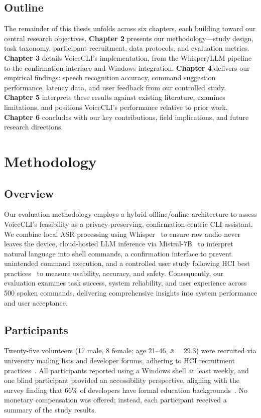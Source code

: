 \documentclass[a4paper,12pt]{article}
\begin{document}
\subsection{Outline}

The remainder of this thesis unfolds across six chapters, each building toward our central research objectives. \textbf{Chapter 2} presents our methodology—study design, task taxonomy, participant recruitment, data protocols, and evaluation metrics. \textbf{Chapter 3} details VoiceCLI's implementation, from the Whisper/LLM pipeline to the confirmation interface and Windows integration. \textbf{Chapter 4} delivers our empirical findings: speech recognition accuracy, command suggestion performance, latency data, and user feedback from our controlled study. \textbf{Chapter 5} interprets these results against existing literature, examines limitations, and positions VoiceCLI's performance relative to prior work. \textbf{Chapter 6} concludes with our key contributions, field implications, and future research directions.

\newpage





\newpage
\section{Methodology}
\label{sec:method}

\subsection{Overview}
Our evaluation methodology employs a hybrid offline/online architecture to assess VoiceCLI's feasibility as a privacy-preserving, confirmation-centric CLI assistant. We combine local ASR processing using Whisper~\cite{ref10} to ensure raw audio never leaves the device, cloud-hosted LLM inference via Mistral-7B~\cite{ref11} to interpret natural language into shell commands, a confirmation interface to prevent unintended command execution, and a controlled user study following HCI best practices~\cite{ref12,ref4} to measure usability, accuracy, and safety. Consequently, our evaluation examines task success, system reliability, and user experience across 500 spoken commands, delivering comprehensive insights into system performance and user acceptance.

\subsection{Participants}
\noindent Twenty-five volunteers (17 male, 8 female; age 21–46, $\bar{x}=29.3$) were recruited via university mailing lists and developer forums, adhering to HCI recruitment practices~\cite{ref12}. All participants reported using a Windows shell at least weekly, and one blind participant provided an accessibility perspective, aligning with the survey finding that 66\% of developers have formal education backgrounds~\cite{ref2}. No monetary compensation was offered; instead, each participant received a summary of the study results.
\end{document}
